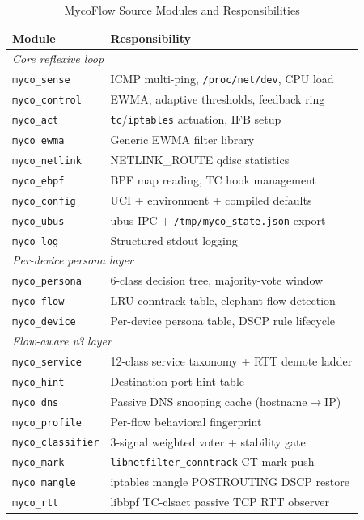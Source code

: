 \begin{table}[h]
\caption{MycoFlow Source Modules and Responsibilities}
\label{tab:modules}
\centering
\small
{\setlength{\tabcolsep}{6pt}
\begin{tabular}{p{3.5cm}p{8cm}}
\toprule
\textbf{Module} & \textbf{Responsibility} \\
\midrule
\multicolumn{2}{l}{\emph{Core reflexive loop}} \\
\texttt{myco\_sense}      & ICMP multi-ping, \texttt{/proc/net/dev}, CPU load \\
\texttt{myco\_control}    & EWMA, adaptive thresholds, feedback ring \\
\texttt{myco\_act}        & \texttt{tc}/\texttt{iptables} actuation, IFB setup \\
\texttt{myco\_ewma}       & Generic EWMA filter library \\
\texttt{myco\_netlink}    & NETLINK\_ROUTE qdisc statistics \\
\texttt{myco\_ebpf}       & BPF map reading, TC hook management \\
\texttt{myco\_config}     & UCI + environment + compiled defaults \\
\texttt{myco\_ubus}       & ubus IPC + \texttt{/tmp/myco\_state.json} export \\
\texttt{myco\_log}        & Structured stdout logging \\
\midrule
\multicolumn{2}{l}{\emph{Per-device persona layer}} \\
\texttt{myco\_persona}    & 6-class decision tree, majority-vote window \\
\texttt{myco\_flow}       & LRU conntrack table, elephant flow detection \\
\texttt{myco\_device}     & Per-device persona table, DSCP rule lifecycle \\
\midrule
\multicolumn{2}{l}{\emph{Flow-aware v3 layer}} \\
\texttt{myco\_service}    & 12-class service taxonomy + RTT demote ladder \\
\texttt{myco\_hint}       & Destination-port hint table \\
\texttt{myco\_dns}        & Passive DNS snooping cache (hostname$\to$IP) \\
\texttt{myco\_profile}    & Per-flow behavioral fingerprint \\
\texttt{myco\_classifier} & 3-signal weighted voter + stability gate \\
\texttt{myco\_mark}       & \texttt{libnetfilter\_conntrack} CT-mark push \\
\texttt{myco\_mangle}     & iptables mangle POSTROUTING DSCP restore \\
\texttt{myco\_rtt}        & libbpf TC-clsact passive TCP RTT observer \\
\bottomrule
\end{tabular}}
\end{table}

